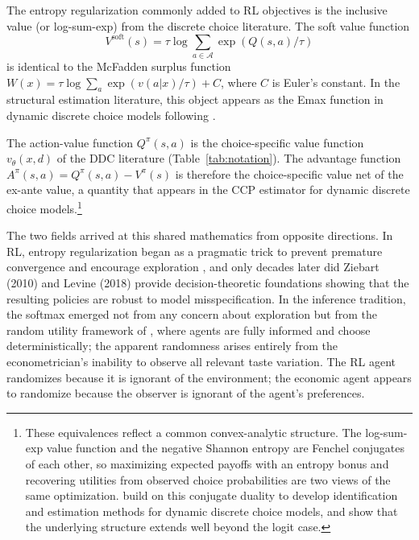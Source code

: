 The entropy regularization commonly added to RL objectives is the inclusive value (or log-sum-exp) from the discrete choice literature. The soft value function
\begin{equation}
\label{eq:soft_value}
V^{\text{soft}}(s) = \tau \log \sum_{a \in \mathcal{A}} \exp(Q(s,a) / \tau)
\end{equation}
is identical to the McFadden surplus function $W(x) = \tau \log \sum_a \exp(v(a|x)/\tau) + C$, where $C$ is Euler's constant. In the structural estimation literature, this object appears as the Emax function in dynamic discrete choice models following \citet{Rust1987}.

The action-value function $Q^\pi(s,a)$ is the choice-specific value function $v_\theta(x,d)$ of the DDC literature (Table~\ref{tab:notation}). The advantage function $A^\pi(s,a) = Q^\pi(s,a) - V^\pi(s)$ is therefore the choice-specific value net of the ex-ante value, a quantity that appears in the \citet{HotzMiller1993} CCP estimator for dynamic discrete choice models.\footnote{These equivalences reflect a common convex-analytic structure. The log-sum-exp value function and the negative Shannon entropy are Fenchel conjugates of each other, so maximizing expected payoffs with an entropy bonus and recovering utilities from observed choice probabilities are two views of the same optimization. \citet{ChiongGalichonShum2016} build on this conjugate duality to develop identification and estimation methods for dynamic discrete choice models, and \citet{FosgerauSorensen2022} show that the underlying structure extends well beyond the logit case.}

The two fields arrived at this shared mathematics from opposite directions. In RL, entropy regularization began as a pragmatic trick to prevent premature convergence and encourage exploration \citep{WilliamsPeng1991}, and only decades later did Ziebart (2010) and Levine (2018) provide decision-theoretic foundations showing that the resulting policies are robust to model misspecification. In the inference tradition, the softmax emerged not from any concern about exploration but from the random utility framework of \citet{McFadden1974}, where agents are fully informed and choose deterministically; the apparent randomness arises entirely from the econometrician's inability to observe all relevant taste variation. The RL agent randomizes because it is ignorant of the environment; the economic agent appears to randomize because the observer is ignorant of the agent's preferences.

